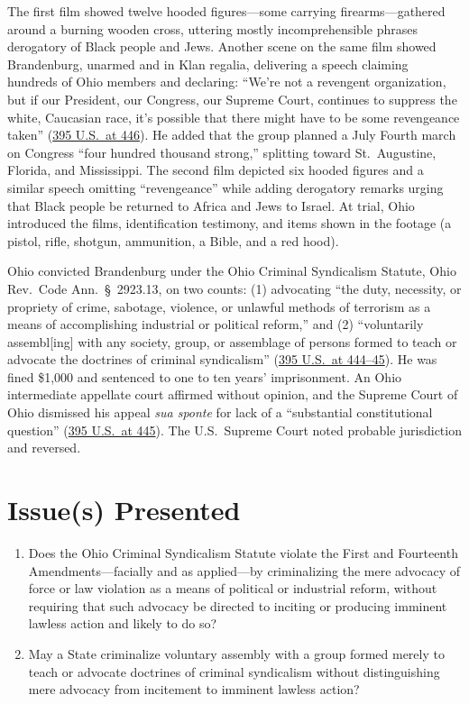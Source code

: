 \documentclass[12pt]{article}
\begin{document}
The first film showed twelve hooded figures---some carrying firearms---gathered around a burning wooden cross, uttering mostly incomprehensible phrases derogatory of Black people and Jews. Another scene on the same film showed Brandenburg, unarmed and in Klan regalia, delivering a speech claiming hundreds of Ohio members and declaring: ``We're not a revengent organization, but if our President, our Congress, our Supreme Court, continues to suppress the white, Caucasian race, it's possible that there might have to be some revengeance taken'' (\href{https://supreme.justia.com/cases/federal/us/395/444/}{395 U.S.\ at 446}). He added that the group planned a July Fourth march on Congress ``four hundred thousand strong,'' splitting toward St.\ Augustine, Florida, and Mississippi. The second film depicted six hooded figures and a similar speech omitting ``revengeance'' while adding derogatory remarks urging that Black people be returned to Africa and Jews to Israel. At trial, Ohio introduced the films, identification testimony, and items shown in the footage (a pistol, rifle, shotgun, ammunition, a Bible, and a red hood).

Ohio convicted Brandenburg under the Ohio Criminal Syndicalism Statute, Ohio Rev.\ Code Ann.\ \S~2923.13, on two counts: (1) advocating ``the duty, necessity, or propriety of crime, sabotage, violence, or unlawful methods of terrorism as a means of accomplishing industrial or political reform,'' and (2) ``voluntarily assembl[ing] with any society, group, or assemblage of persons formed to teach or advocate the doctrines of criminal syndicalism'' (\href{https://supreme.justia.com/cases/federal/us/395/444/}{395 U.S.\ at 444--45}). He was fined \$1,000 and sentenced to one to ten years' imprisonment. An Ohio intermediate appellate court affirmed without opinion, and the Supreme Court of Ohio dismissed his appeal \emph{sua sponte} for lack of a ``substantial constitutional question'' (\href{https://supreme.justia.com/cases/federal/us/395/444/}{395 U.S.\ at 445}). The U.S.\ Supreme Court noted probable jurisdiction and reversed.

\section{Issue(s) Presented}

\begin{enumerate}
  \item Does the Ohio Criminal Syndicalism Statute violate the First and Fourteenth Amendments---facially and as applied---by criminalizing the mere advocacy of force or law violation as a means of political or industrial reform, without requiring that such advocacy be directed to inciting or producing imminent lawless action and likely to do so?
  \item May a State criminalize voluntary assembly with a group formed merely to teach or advocate doctrines of criminal syndicalism without distinguishing mere advocacy from incitement to imminent lawless action?
\end{enumerate}
\end{document}
